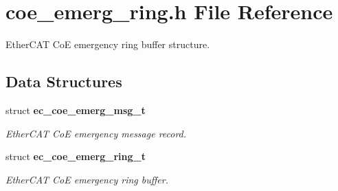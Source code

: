 \section{coe\-\_\-emerg\-\_\-ring.\-h \-File \-Reference}
\label{coe__emerg__ring_8h}


\-Ether\-C\-A\-T \-Co\-E emergency ring buffer structure.  


\subsection*{\-Data \-Structures}
\begin{DoxyCompactItemize}
\item 
struct {\bf ec\-\_\-coe\-\_\-emerg\-\_\-msg\-\_\-t}
\begin{DoxyCompactList}\small\item\em \-Ether\-C\-A\-T \-Co\-E emergency message record. \end{DoxyCompactList}\item 
struct {\bf ec\-\_\-coe\-\_\-emerg\-\_\-ring\-\_\-t}
\begin{DoxyCompactList}\small\item\em \-Ether\-C\-A\-T \-Co\-E emergency ring buffer. \end{DoxyCompactList}\end{DoxyCompactItemize}
